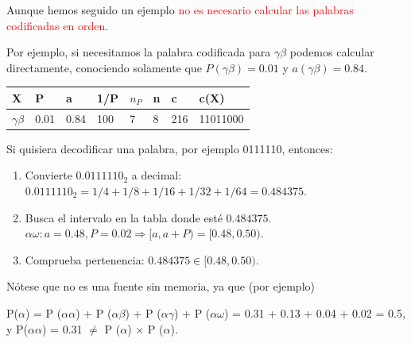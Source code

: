 \documentclass{beamer}
\theoremstyle{plain}
\theoremstyle{example}
\theoremstyle{example}
\begin{document}
\begin{frame}  \small 

Aunque hemos seguido un ejemplo \textcolor{red}{no es necesario calcular las palabras codificadas en orden}. 

\vspace{0.5cm}

Por ejemplo, si necesitamos la palabra codificada para $\gamma\beta$ podemos calcular directamente, conociendo solamente que $P(\gamma\beta) = 0.01$ y $a(\gamma\beta) = 0.84$.

\begin{center}
 \begin{tabular}{| l | l | l | l | l | l | l | l|}\hline
        		 X             & P       &   a    & 1/P & $n_P$  & n & c     & c(X)\\\hline\hline
   $\gamma\beta$    & 0.01 & 0.84 & 100   & 7       & 8 & 216  & 11011000\\\hline
   \end{tabular}
\end{center}


Si quisiera decodificar una palabra, por ejemplo 0111110, entonces:
\footnotesize
\begin{enumerate}
    \item Convierte $0.0111110_2$ a decimal: $0.0111110_2 = 1/4 + 1/8 + 1/16+ 1/32 + 1/64 =0.484375.$
    \item Busca el intervalo en la tabla donde esté  $0.484375$.
    $\alpha\omega: a=0.48, P = 0.02 \Rightarrow [a,a+P)=[0.48,0.50).$
    \item Comprueba pertenencia: $0.484375 \in [0.48,0.50)$.
\end{enumerate}

\footnotesize 
Nótese que no es una fuente sin memoria, ya que (por ejemplo)

P($\alpha$) = P ($\alpha\alpha$) + P ($\alpha\beta$) + P ($\alpha\gamma$) + P ($\alpha\omega$) = 0.31 + 0.13 + 0.04 + 0.02 = 0.5, y P($\alpha\alpha$) = 0.31 $\neq$ P ($\alpha$) $\times$ P ($\alpha$).

\end{frame} 



\end{document}
